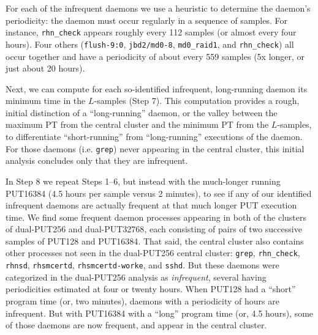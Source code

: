 \documentclass[letter]{ieice}
\begin{document}
{\color{blue}
For each of the infrequent daemons 
we use a heuristic to determine the daemon's periodicity:
the daemon must occur regularly in a sequence of samples.
For instance, {\tt rhn\_check} appears 
roughly every 112 samples 
(or almost every four hours). 
Four others ({\tt flush-9:0}, {\tt jbd2/md0-8}, {\tt md0\_raid1}, and {\tt rhn\_check}) 
all occur together and have a periodicity of about every 559 samples 
(5x longer, or just about 20 hours). 
}

Next, we can compute for each so-identified infrequent, long-running daemon its
minimum time in the \hbox{$L$-samples} (Step 7). 
This computation provides a rough, initial distinction of a ``long-running''
daemon, or the valley between the maximum PT from the central cluster 
and the minimum PT from the $L$-samples, to differentiate ``short-running'' 
from ``\hbox{long-running}'' executions of the daemon. 
For those daemons (i.e. {\tt grep}) never appearing in the central cluster,
this initial analysis concludes only that they are infrequent.

In Step 8 we repeat Steps 1--6, but instead with the much-longer running
PUT16384 (4.5 hours per \hbox{sample} versus 2 minutes), to see 
if any of our identified \hbox{infrequent} daemons are actually frequent 
at that much longer PUT execution time. 
We find some frequent daemon processes appearing in both of the 
clusters of \hbox{dual-PUT256} and \hbox{dual-PUT32768}{\color{blue}, each consisting of 
pairs of two successive samples of PUT128 and PUT16384}. 
That said, the central cluster also contains other
  processes not seen in the \hbox{dual-PUT256} central cluster: 
  {\tt grep}, {\tt rhn\_check}, {\tt rhnsd}, {\tt rhsmcertd}, 
  {\tt rhsmcertd-worke}, and {\tt sshd}. 
  But these daemons were categorized in the \hbox{dual-PUT256} analysis as {\em
  infrequent}, several having \hbox{periodicities} estimated at four or twenty hours.
When {\color{blue}PUT128} had a ``short'' 
program time {\color{blue}(or, two minutes)}, daemons with a periodicity of
hours are \hbox{infrequent}. But with {\color{blue}PUT16384} 
with a ``long'' program time {\color{blue}(or, 4.5 hours)}, some of those daemons are now frequent, and appear in the central cluster.
\end{document}
